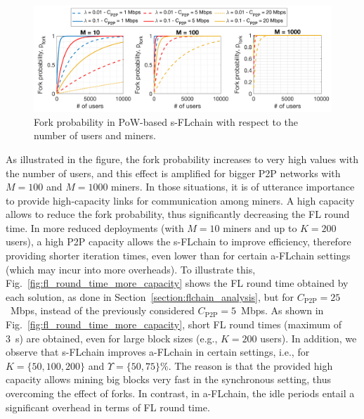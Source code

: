 \documentclass[10pt,journal,compsoc]{IEEEtran}
\begin{document}
\begin{figure}[ht!]
	\centering
	\includegraphics[width=1\linewidth]{img/0_fork_probability.png}
	\caption{Fork probability in PoW-based s-FLchain with respect to the number of users and miners.}
	\label{fig:0_fork_probability}
\end{figure}

As illustrated in the figure, the fork probability increases to very high values with the number of users, and this effect is amplified for bigger P2P networks with $M=100$ and $M=1000$ miners. In those situations, it is of utterance importance to provide high-capacity links for communication among miners. A high capacity allows to reduce the fork probability, thus significantly decreasing the FL round time. In more reduced deployments (with $M=10$ miners and up to $K=200$ users), a high P2P capacity allows the s-FLchain to improve efficiency, therefore providing shorter iteration times, even lower than for certain a-FLchain settings (which may incur into more overheads). To illustrate this, Fig.~\ref{fig:fl_round_time_more_capacity} shows the FL round time obtained by each solution, as done in Section~\ref{section:flchain_analysis}, but for $C_\text{P2P} = 25$~Mbps, instead of the previously considered $C_\text{P2P} = 5$~Mbps. As shown in Fig.~\ref{fig:fl_round_time_more_capacity}, short FL round times (maximum of 3~s) are obtained, even for large block sizes (e.g., $K=200$ users). In addition, we observe that s-FLchain improves a-FLchain in certain settings, i.e., for $K=\{50,100,200\}$ and $\Upsilon=\{50,75\}\%$. The reason is that the provided high capacity allows mining big blocks very fast in the synchronous setting, thus overcoming the effect of forks. In contrast, in a-FLchain, the idle periods entail a significant overhead in terms of FL round time. 
\end{document}
